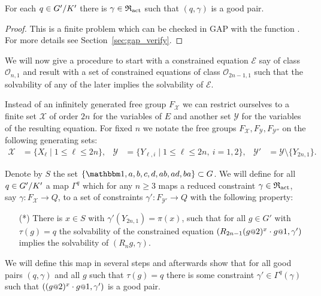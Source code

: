 \documentclass[a4paper,11pt]{amsart}
\begin{document}
\begin{lem} \label{lem:existsGoodGamma}
 For each $q\in{G'/K'}$ there is $\gamma\in \mathfrak{R}_{\operatorname{act}}$ such that $(q,\gamma)$ is a 
 good pair.
\end{lem}
\begin{proof}
 This is a finite problem which can be checked in GAP with the function .
 For more details see Section~\ref{sec:gap_verify}.
\end{proof}
We will now give a procedure to start with a constrained equation $\mathcal E$
say of
class $\mathcal{O}_{n,1}$ and result with a set of constrained equations of
class $\mathcal{O}_{2n-1,1}$ such that the solvability of any of the later
implies the solvability of $\mathcal E$.

Instead of an infinitely generated free group $F_{\mathcal{X}}$ we can restrict
ourselves to a finite set $\mathcal{X}$ of order $2n$ for the variables of $E$
and another set $\mathcal{Y}$ for the variables of the resulting equation.
For fixed $n$ we notate the free groups $F_{\mathcal{X}},F_{\mathcal{Y}},F_{
\mathcal{Y''}}$ on the following generating sets:
\begin{align*}
 \mathcal{X} &= \{ X_\ell \mid 1\leq \ell \leq 2n\},& 
 \mathcal{Y} &= \{ Y_{\ell,i} \mid 1\leq \ell \leq 2n,\ i=1,2 \},&
 \mathcal{Y}' &= \mathcal{Y}\setminus\{Y_{2n,1}\}.
\end{align*}

Denote by $S$ the set $\{\id,a,b,c,d,ab,ad,ba\}\subset G$.
 We will define for all $q\in {G'/K'}$
a map $\Gamma^q$ which for any $n \ge 3$ maps a reduced constraint
$\gamma\in\mathfrak{R}_{\operatorname{act}}$, say $\gamma\colon F_{\mathcal X} \to Q$, to a set of
constraints $\gamma'\colon F_{\mathcal Y'}\to Q$ with the following property:
\begin{itemize}
\item[(*)] There is $x\in S$ with $\gamma'(Y_{2n,1})=\pi(x)$, such that 
  for all $g\in G'$ with $\tau(g)=q$ the solvability of the constrained equation
  $(R_{2n-1} (g\at{2})^x \cdot g\at{1},\gamma')$ implies
  the solvability of $(R_ng,\gamma)$.
\end{itemize}

We will define this map in several steps and afterwards show that for
all good pairs $(q,\gamma)$ and all $g$ such that $\tau(g)=q$ there is
some constraint $\gamma' \in \Gamma^q(\gamma)$ such that
$((g\at{2})^x \cdot g\at{1},\gamma')$ is a good pair.
 
\end{document}
